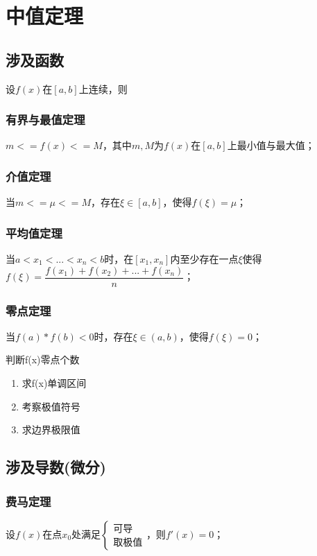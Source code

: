 
\chapter{中值定理}

\section{涉及函数}
设\(f(x)\)在\([a, b]\)上连续，则

\subsection{有界与最值定理}
\(m <= f(x) <= M\)，其中\(m, M\)为\(f(x)\)在\([a, b]\)上最小值与最大值；

\subsection{介值定理}
当\(m <= \mu <= M\)，存在\(\xi \in [a, b]\)，使得\(f(\xi) = \mu\)；

\subsection{平均值定理}
当\(a < x_1 < ... < x_n < b\)时，在\([x_1, x_n]\)内至少存在一点\(\xi\)使得\(f(\xi) = \dfrac{f(x_1) + f(x_2) + ... + f(x_n)}{n}\)；

\subsection{零点定理}
当\(f(a) * f(b) < 0\)时，存在\(\xi \in (a, b)\)，使得\(f(\xi) = 0\)；

判断f(x)零点个数
\begin{enumerate}
    \item 求f(x)单调区间
    \item 考察极值符号
    \item 求边界极限值
\end{enumerate}


\section{涉及导数(微分)}

\subsection{费马定理}
设\(f(x)\)在点\(x_0\)处满足\(\begin{cases}
\text{可导} \\ 
\text{取极值}
\end{cases}\)，则\(f'(x) = 0\)；


